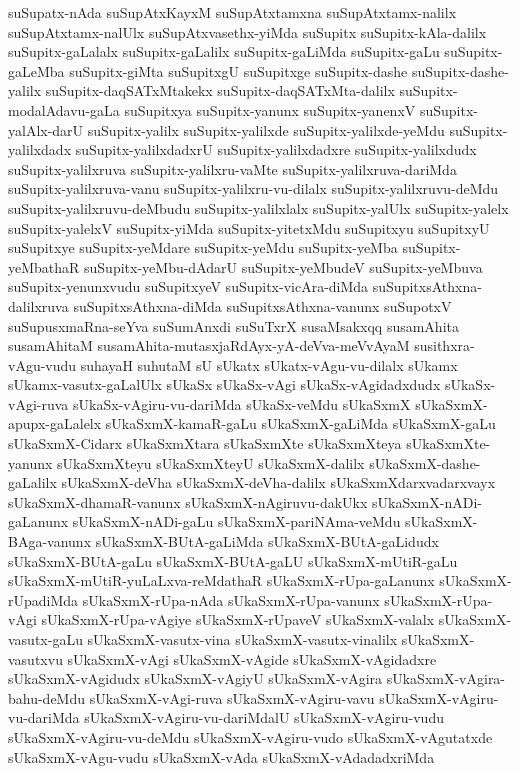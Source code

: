 {suSupatx-nAda
suSupAtxKayxM
suSupAtxtamxna
suSupAtxtamx-nalilx
suSupAtxtamx-nalUlx
suSupAtxvasethx-yiMda
suSupitx
suSupitx-kAla-dalilx
suSupitx-gaLalalx
suSupitx-gaLalilx
suSupitx-gaLiMda
suSupitx-gaLu
suSupitx-gaLeMba
suSupitx-giMta
suSupitxgU
suSupitxge
suSupitx-dashe
suSupitx-dashe-yalilx
suSupitx-daqSATxMtakekx
suSupitx-daqSATxMta-dalilx
suSupitx-modalAdavu-gaLa
suSupitxya
suSupitx-yanunx
suSupitx-yanenxV
suSupitx-yalAlx-darU
suSupitx-yalilx
suSupitx-yalilxde
suSupitx-yalilxde-yeMdu
suSupitx-yalilxdadx
suSupitx-yalilxdadxrU
suSupitx-yalilxdadxre
suSupitx-yalilxdudx
suSupitx-yalilxruva
suSupitx-yalilxru-vaMte
suSupitx-yalilxruva-dariMda
suSupitx-yalilxruva-vanu
suSupitx-yalilxru-vu-dilalx
suSupitx-yalilxruvu-deMdu
suSupitx-yalilxruvu-deMbudu
suSupitx-yalilxlalx
suSupitx-yalUlx
suSupitx-yalelx
suSupitx-yalelxV
suSupitx-yiMda
suSupitx-yitetxMdu
suSupitxyu
suSupitxyU
suSupitxye
suSupitx-yeMdare
suSupitx-yeMdu
suSupitx-yeMba
suSupitx-yeMbathaR
suSupitx-yeMbu-dAdarU
suSupitx-yeMbudeV
suSupitx-yeMbuva
suSupitx-yenunxvudu
suSupitxyeV
suSupitx-vicAra-diMda
suSupitxsAthxna-dalilxruva
suSupitxsAthxna-diMda
suSupitxsAthxna-vanunx
suSupotxV
suSupusxmaRna-seYva
suSumAnxdi
suSuTxrX
susaMsakxqq
susamAhita
susamAhitaM
susamAhita-mutasxjaRdAyx-yA-deVva-meVvAyaM
susithxra-vAgu-vudu
suhayaH
suhutaM
sU
sUkatx
sUkatx-vAgu-vu-dilalx
sUkamx
sUkamx-vasutx-gaLalUlx
sUkaSx
sUkaSx-vAgi
sUkaSx-vAgidadxdudx
sUkaSx-vAgi-ruva
sUkaSx-vAgiru-vu-dariMda
sUkaSx-veMdu
sUkaSxmX
sUkaSxmX-apupx-gaLalelx
sUkaSxmX-kamaR-gaLu
sUkaSxmX-gaLiMda
sUkaSxmX-gaLu
sUkaSxmX-Cidarx
sUkaSxmXtara
sUkaSxmXte
sUkaSxmXteya
sUkaSxmXte-yanunx
sUkaSxmXteyu
sUkaSxmXteyU
sUkaSxmX-dalilx
sUkaSxmX-dashe-gaLalilx
sUkaSxmX-deVha
sUkaSxmX-deVha-dalilx
sUkaSxmXdarxvadarxvayx
sUkaSxmX-dhamaR-vanunx
sUkaSxmX-nAgiruvu-dakUkx
sUkaSxmX-nADi-gaLanunx
sUkaSxmX-nADi-gaLu
sUkaSxmX-pariNAma-veMdu
sUkaSxmX-BAga-vanunx
sUkaSxmX-BUtA-gaLiMda
sUkaSxmX-BUtA-gaLidudx
sUkaSxmX-BUtA-gaLu
sUkaSxmX-BUtA-gaLU
sUkaSxmX-mUtiR-gaLu
sUkaSxmX-mUtiR-yuLaLxva-reMdathaR
sUkaSxmX-rUpa-gaLanunx
sUkaSxmX-rUpadiMda
sUkaSxmX-rUpa-nAda
sUkaSxmX-rUpa-vanunx
sUkaSxmX-rUpa-vAgi
sUkaSxmX-rUpa-vAgiye
sUkaSxmX-rUpaveV
sUkaSxmX-valalx
sUkaSxmX-vasutx-gaLu
sUkaSxmX-vasutx-vina
sUkaSxmX-vasutx-vinalilx
sUkaSxmX-vasutxvu
sUkaSxmX-vAgi
sUkaSxmX-vAgide
sUkaSxmX-vAgidadxre
sUkaSxmX-vAgidudx
sUkaSxmX-vAgiyU
sUkaSxmX-vAgira
sUkaSxmX-vAgira-bahu-deMdu
sUkaSxmX-vAgi-ruva
sUkaSxmX-vAgiru-vavu
sUkaSxmX-vAgiru-vu-dariMda
sUkaSxmX-vAgiru-vu-dariMdalU
sUkaSxmX-vAgiru-vudu
sUkaSxmX-vAgiru-vu-deMdu
sUkaSxmX-vAgiru-vudo
sUkaSxmX-vAgutatxde
sUkaSxmX-vAgu-vudu
sUkaSxmX-vAda
sUkaSxmX-vAdadadxriMda
}
